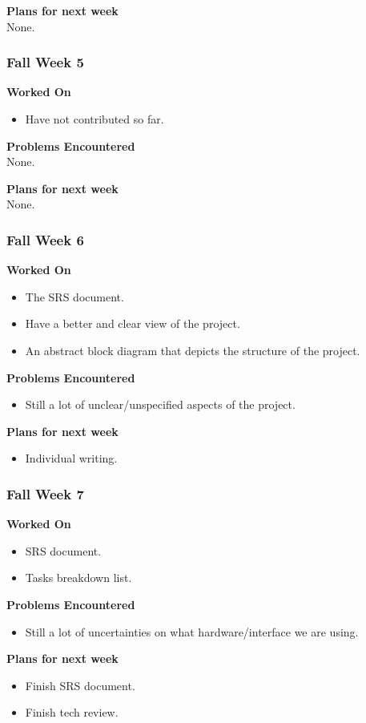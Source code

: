 \documentclass[compsoc,draftclsnofoot,onecolumn,10pt]{IEEEtran}
\begin{document}
\textbf{Plans for next week}\\
None.



\subsubsection*{Fall Week 5}
\textbf{Worked On}
\begin{itemize}
  \item Have not contributed so far.
\end{itemize}
\textbf{Problems Encountered}\\
None.

\textbf{Plans for next week}\\
None.



\subsubsection*{Fall Week 6}
\textbf{Worked On}
\begin{itemize}
  \item The SRS document.
  \item Have a better and clear view of the project.
  \item An abstract block diagram that depicts the structure of the project.
\end{itemize}
\textbf{Problems Encountered}
\begin{itemize}
  \item Still a lot of unclear/unspecified aspects of the project.
\end{itemize}
\textbf{Plans for next week}
\begin{itemize}
  \item Individual writing.
\end{itemize}


\subsubsection*{Fall Week 7}
\textbf{Worked On}
\begin{itemize}
  \item SRS document.
  \item Tasks breakdown list.
\end{itemize}
\textbf{Problems Encountered}
\begin{itemize}
  \item Still a lot of uncertainties on what hardware/interface we are using.
\end{itemize}
\textbf{Plans for next week}
\begin{itemize}
  \item Finish SRS document.
  \item Finish tech review.
\end{itemize}
\end{document}
